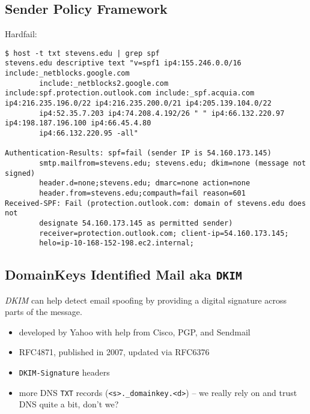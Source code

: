 \documentclass[xga]{xdvislides}
\begin{document}
\subsection{Sender Policy Framework}
Hardfail:
\begin{verbatim}
$ host -t txt stevens.edu | grep spf
stevens.edu descriptive text "v=spf1 ip4:155.246.0.0/16 include:_netblocks.google.com
        include:_netblocks2.google.com include:spf.protection.outlook.com include:_spf.acquia.com ip4:216.235.196.0/22 ip4:216.235.200.0/21 ip4:205.139.104.0/22
        ip4:52.35.7.203 ip4:74.208.4.192/26 " " ip4:66.132.220.97 ip4:198.187.196.100 ip4:66.45.4.80
        ip4:66.132.220.95 -all"

Authentication-Results: spf=fail (sender IP is 54.160.173.145)
        smtp.mailfrom=stevens.edu; stevens.edu; dkim=none (message not signed)
        header.d=none;stevens.edu; dmarc=none action=none
        header.from=stevens.edu;compauth=fail reason=601
Received-SPF: Fail (protection.outlook.com: domain of stevens.edu does not
        designate 54.160.173.145 as permitted sender)
        receiver=protection.outlook.com; client-ip=54.160.173.145;
        helo=ip-10-168-152-198.ec2.internal;
\end{verbatim}

\subsection{DomainKeys Identified Mail aka {\tt DKIM}}
{\em DKIM} can help detect email spoofing by providing a
digital signature across parts of the message.

\begin{itemize}
	\item developed by Yahoo with help from Cisco, PGP, and Sendmail
	\item RFC4871, published in 2007, updated via RFC6376
	\item {\tt DKIM-Signature} headers
	\item more DNS {\tt TXT} records (\verb+<s>._domainkey.<d>+) -- we really rely on and trust DNS quite a bit, don't we?
\end{itemize}
\end{document}
